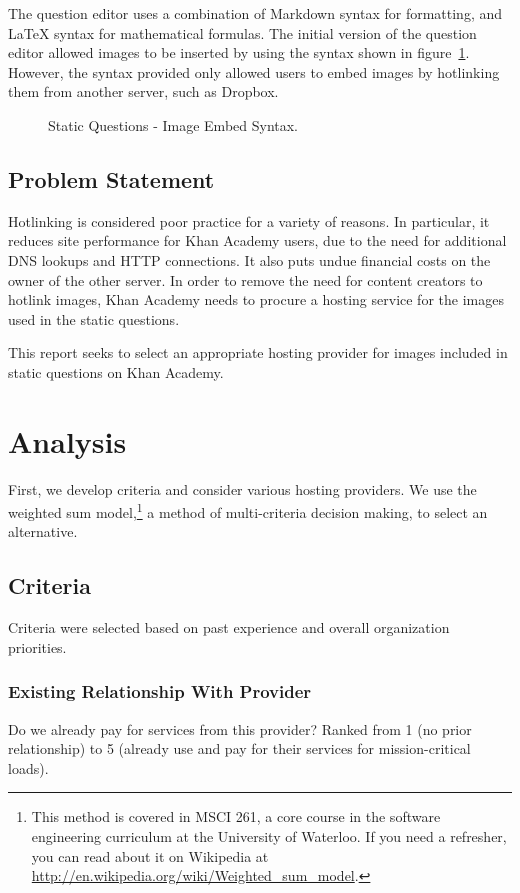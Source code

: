 \documentclass[se]{uw-wkrpt}
\begin{document}
The question editor uses a combination of Markdown syntax for formatting, and 
LaTeX syntax for mathematical formulas. The initial version of the question 
editor allowed images to be inserted by using the syntax shown in 
figure~\ref{fig:imgsyntax}. However, the syntax provided only allowed users to 
embed images by hotlinking them from another server, such as Dropbox.

\begin{figure}
  \centering
  
  \caption{Static Questions - Image Embed Syntax.}
  \label{fig:imgsyntax}
\end {figure}

\subsection{Problem Statement}\label{sec:problem}
Hotlinking is considered poor practice for a variety of reasons. In particular, 
it reduces site performance for Khan Academy users, due to the need for 
additional DNS lookups and HTTP connections. It also puts undue financial costs 
on the owner of the other server. In order to remove the need for content 
creators to hotlink images, Khan Academy needs to procure a hosting service for 
the images used in the static questions.

This report seeks to select an appropriate hosting provider for images included 
in static questions on Khan Academy.

\section{Analysis}
First, we develop criteria and consider various hosting providers. We use the 
weighted sum model,\footnote{This method is covered in MSCI 261, a core course 
in the software engineering curriculum at the University of Waterloo. If you 
need a refresher, you can read about it on Wikipedia at
\url{http://en.wikipedia.org/wiki/Weighted_sum_model}.} a method of
multi-criteria decision making, to select an alternative.

\subsection {Criteria}
Criteria were selected based on past experience and overall organization 
priorities.

\subsubsection{Existing Relationship With Provider}
Do we already pay for services from this provider? Ranked from 1 (no prior 
relationship) to 5 (already use and pay for their services for mission-critical 
loads).
\end{document}

